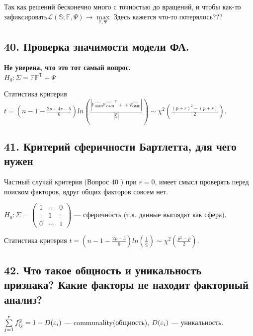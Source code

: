 Так как решений бесконечно много с точностью до вращений, и чтобы как-то зафиксировать$\mathcal{L}(\mathbb{S};\mathbb{F}, \Psi) \rightarrow \max\limits_{\mathbb{F},\Psi}$
{\color{red} Здесь кажется что-то потерялось???}

\subsection{ 40.  Проверка значимости модели ФА.}

{\bf{Не уверена, что это тот самый вопрос.}} \\
$H_{0}: \Sigma = \mathbb{FF^\mathrm{T}} + \Psi$ 

Статистика критерия $t = \left(n-1 - \frac{2p+4r-5}{6}\right)ln\left(\frac{|\mathbb{\hat{F_{ОМП}}\hat{F_{ОМП}}^\mathrm{T}+}+\hat{\Psi_{ОМП}}|}{|\mathrm{\hat{S}}|}\right) \sim \chi^2\left(\frac{(p+r)^2 - (p+r)}{2}\right)$.


\subsection{ 41.  Критерий сферичности Бартлетта, для чего нужен}


Частный случай критерия (Вопрос 40 ) при $r = 0$, имеет смысл проверять перед поиском факторов, вдруг общих факторов совсем нет.

$H_0: \Sigma =  \left(\begin{matrix}
1&\cdots& 0 \\
\vdots&1& \vdots \\
0&\cdots& 1
\end{matrix}\right)$ --- сферичность (т.к. данные выглядят как сфера).

Статистика критерия $t = \left(n-1 - \frac{2p-5}{6}\right)ln\left(\frac{1}{\mathbb{\hat{S}}}\right) \sim \chi^2\left(\frac{p^2 - p}{2}\right)$.

\subsection{ 42. Что такое общность и уникальность признака? Какие факторы не находит факторный анализ?}

$\sum\limits_{j = 1}^r{f_{ij}^2 = 1 - D(\varepsilon_i)}$ --- communality(общность),  $D(\varepsilon_i)$ --- уникальность.



